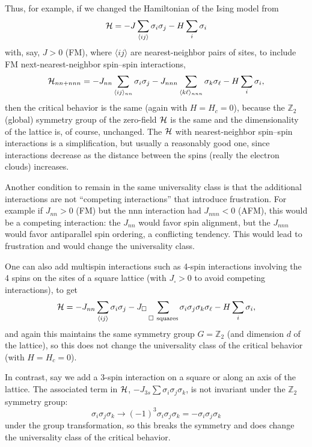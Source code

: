 Thus, for example, if we changed the Hamiltonian of the Ising model from
\begin{equation}
  \mathcal{H} = -J\sum_{\langle ij\rangle}\sigma_i\sigma_j - H\sum_i\sigma_i
\end{equation}
with, say, $J>0$ (FM), where $\langle ij\rangle$ are nearest-neighbor pairs of sites, to
include FM next-nearest-neighbor spin--spin interactions,
\begin{equation}
  \mathcal{H}_{nn+nnn} = -J_{nn}\sum_{\langle ij\rangle_{nn}}\sigma_i\sigma_j
                  - J_{nnn}\sum_{\langle k\ell\rangle_{nnn}}\sigma_k\sigma_\ell
                  - H\sum_i\sigma_i ,
\end{equation}
then the critical behavior is the same (again with $H = H_c = 0$), because the
$\mathbb{Z}_2$ (global) symmetry group of the zero-field $\mathcal{H}$ is the same and the
dimensionality of the lattice is, of course, unchanged. The $\mathcal{H}$ with nearest-neighbor
spin--spin interactions is a simplification, but usually a reasonably good one, since
interactions decrease as the distance between the spins (really the electron clouds)
increases.

Another condition to remain in the same universality class is that the additional
interactions are not ``competing interactions'' that introduce frustration. For example
if $J_{nn}>0$ (FM) but the nnn interaction had $J_{nnn}<0$ (AFM), this would be a
competing interaction: the $J_{nn}$ would favor spin alignment, but the $J_{nnn}$ would
favor antiparallel spin ordering, a conflicting tendency. This would lead to frustration
and would change the universality class.

One can also add multispin interactions such as 4-spin interactions involving the 4
spins on the sites of a square lattice (with $J_\square>0$ to avoid competing
interactions), to get
\begin{equation}
  \Ham = -J_{nn}\sum_{\langle ij\rangle}\sigma_i\sigma_j
         - J_\square\sum_{\square\ \text{squares}}\sigma_i\sigma_j\sigma_k\sigma_\ell
         - H\sum_i\sigma_i ,
\end{equation}
and again this maintains the same symmetry group $G = \mathbb{Z}_2$ (and dimension $d$ of
the lattice), so this does not change the universality class of the critical behavior
(with $H = H_c = 0$).

In contrast, say we add a 3-spin interaction on a square or along an axis of the
lattice. The associated term in $\mathcal{H}$, $-J_{3s}\sum\sigma_i\sigma_j\sigma_k$, is not
invariant under the $\mathbb{Z}_2$ symmetry group:
\begin{equation}
  \sigma_i\sigma_j\sigma_k\to(-1)^3\sigma_i\sigma_j\sigma_k = -\sigma_i\sigma_j\sigma_k
\end{equation}
under the group transformation, so this breaks the symmetry and does change the
universality class of the critical behavior.

